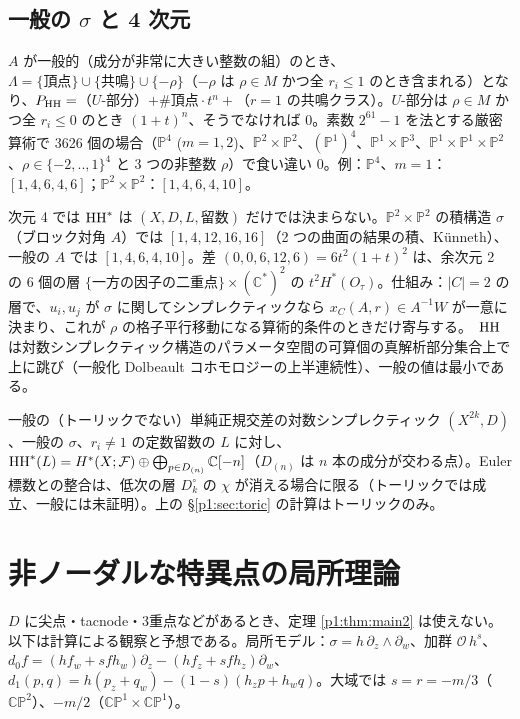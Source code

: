 \subsection{一般の $\sigma$ と 4 次元}
\begin{obs}[\tV]
$A$ が一般的（成分が非常に大きい整数の組）のとき、$\Lambda=\{\text{頂点}\}\cup\{\text{共鳴}\}\cup\{-\rho\}$（$-\rho$ は $\rho\in M$ かつ全 $r_i\le1$ のとき含まれる）となり、$P_{\mathrm{HH}}=$（$U$-部分）$+\#\text{頂点}\cdot t^n+$（$r=1$ の共鳴クラス）。$U$-部分は $\rho\in M$ かつ全 $r_i\le0$ のとき $(1+t)^n$、そうでなければ 0。素数 $2^{61}-1$ を法とする厳密算術で 3626 個の場合（$\mathbb P^4$ ($m=1,2$)、$\mathbb P^2\times\mathbb P^2$、$(\mathbb P^1)^4$、$\mathbb P^1\times\mathbb P^3$、$\mathbb P^1\times\mathbb P^1\times\mathbb P^2$、$\rho\in\{-2,..,1\}^4$ と 3 つの非整数 $\rho$）で食い違い 0。例：$\mathbb P^4$、$m=1$：$[1,4,6,4,6]$；$\mathbb P^2\times\mathbb P^2$：$[1,4,6,4,10]$。
\end{obs}
\begin{obs}\label{p1:obs:arith}
次元 4 では $\mathrm{HH}^*$ は $(X,D,L,\text{留数})$ だけでは決まらない。$\mathbb P^2\times\mathbb P^2$ の積構造 $\sigma$（ブロック対角 $A$）では $[1,4,12,16,16]$（2 つの曲面の結果の積、Künneth）、一般の $A$ では $[1,4,6,4,10]$。差 $(0,0,6,12,6)=6t^2(1+t)^2$ は、余次元 2 の 6 個の層 $\{\text{一方の因子の二重点}\}\times(\mathbb C^*)^2$ の $t^2H^*(O_\tau)$。仕組み：$|C|=2$ の層で、$u_i,u_j$ が $\sigma$ に関してシンプレクティックなら $x_C(A,r)\in A^{-1}W$ が一意に決まり、これが $\rho$ の格子平行移動になる算術的条件のときだけ寄与する。\tK\ $\mathrm{HH}$ は対数シンプレクティック構造のパラメータ空間の可算個の真解析部分集合上で上に跳び（一般化 Dolbeault コホモロジーの上半連続性）、一般の値は最小である。
\end{obs}
\begin{conj}[一般の単純正規交差 $D$]\tK
一般の（トーリックでない）単純正規交差の対数シンプレクティック $(X^{2k},D)$、一般の $\sigma$、$r_i\ne1$ の定数留数の $L$ に対し、$\mathrm{HH}^*(L)=H^*(X;\mathcal F)\oplus\bigoplus_{p\in D_{(n)}}\mathbb C[-n]$（$D_{(n)}$ は $n$ 本の成分が交わる点）。Euler 標数との整合は、低次の層 $D_k^\circ$ の $\chi$ が消える場合に限る（トーリックでは成立、一般には未証明）。上の \S\ref{p1:sec:toric} の計算はトーリックのみ。
\end{conj}

\section{非ノーダルな特異点の局所理論}\label{p1:sec:local}
$D$ に尖点・tacnode・3重点などがあるとき、定理 \ref{p1:thm:main2} は使えない。以下は計算による観察と予想である。局所モデル：$\sigma=h\,\partial_z\wedge\partial_w$、加群 $\mathcal O\,h^s$、$d_0f=(hf_w+sfh_w)\partial_z-(hf_z+sfh_z)\partial_w$、$d_1(p,q)=h(p_z+q_w)-(1-s)(h_zp+h_wq)$。大域では $s=r=-m/3$（$\mathbb{CP}^2$）、$-m/2$（$\mathbb{CP}^1\times\mathbb{CP}^1$）。

